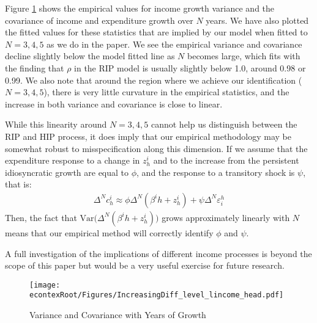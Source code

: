 \documentclass[titlepage]{\econtex}\newcommand{\texname}{ConsumptionHeterogeneity}
\begin{document}
Figure \ref{fig:increasing_diff} shows the empirical values for income growth variance and the covariance of income and expenditure growth over $N$ years. We have also plotted the fitted values for these statistics that are implied by our model when fitted to $N=3,4,5$ as we do in the paper. We see the empirical variance and covariance decline slightly below the model fitted line as $N$ becomes large, which fits with the finding that $\rho$ in the RIP model is usually slightly below 1.0, around 0.98 or 0.99. We also note that around the region where we achieve our identification ($N=3,4,5$), there is very little curvature in the empirical statistics, and the increase in both variance and covariance is close to linear.

While this linearity around $N=3,4,5$ cannot help us distinguish between the RIP and HIP process, it does imply that our empirical methodology may be somewhat robust to misspecification along this dimension. If we assume that the expenditure response to a change in $z^i_h$ and to the increase from the persistent idiosyncratic growth are equal to $\phi$, and the response to a transitory shock is $\psi$, that is:
\begin{align*}
	\Delta^N c^i_h \approx \phi \Delta^N (\beta^i h + z^i_h) + \psi \Delta^N \varepsilon^h_i
\end{align*}
Then, the fact that $\mathrm{Var}\big( \Delta^N (\beta^i h + z^i_h) \big)$ grows approximately linearly with $N$ means that our empirical method will correctly identify $\phi$ and $\psi$.

A full investigation of the implications of different income processes is beyond the scope of this paper but would be a very useful exercise for future research.
	
\begin{figure} 
	\begin{centering}
		\texttt{[image: \\econtexRoot/Figures/IncreasingDiff\_level\_lincome\_head.pdf]}
		\caption{Variance and Covariance with Years of Growth}
		\label{fig:increasing_diff}
	\end{centering}
\end{figure}
\end{document}
